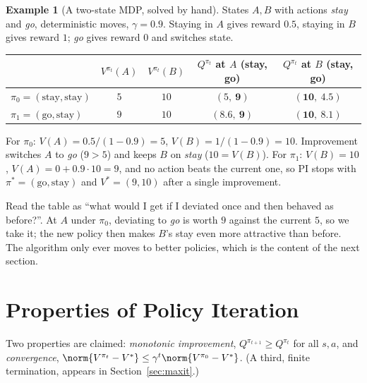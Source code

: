 \documentclass[11pt,a4paper]{article}
\theoremstyle{plain}
\theoremstyle{definition}
\newtheorem{example}[theorem]{Example}
\theoremstyle{remark}
\begin{document}
\begin{example}[A two-state MDP, solved by hand]\label{ex:two}
States $A,B$ with actions \emph{stay} and \emph{go}, deterministic moves, $\gamma=0.9$. Staying in $A$ gives reward $0.5$, staying in $B$ gives reward $1$; \emph{go} gives reward $0$ and switches state.
\begin{center}\small
\begin{tabular}{@{}lcccc@{}}\toprule
 & $V^{\pi_t}(A)$ & $V^{\pi_t}(B)$ & $Q^{\pi_t}$ at $A$ (stay, go) & $Q^{\pi_t}$ at $B$ (stay, go)\\\midrule
$\pi_0=(\text{stay},\text{stay})$ & $5$ & $10$ & $(5,\ \mathbf{9})$ & $(\mathbf{10},\ 4.5)$\\
$\pi_1=(\text{go},\text{stay})$ & $9$ & $10$ & $(8.6,\ \mathbf{9})$ & $(\mathbf{10},\ 8.1)$\\\bottomrule
\end{tabular}
\end{center}
For $\pi_0$: $V(A)=0.5/(1-0.9)=5$, $V(B)=1/(1-0.9)=10$. Improvement switches $A$ to \emph{go} ($9>5$) and keeps $B$ on \emph{stay} ($10=V(B)$). For $\pi_1$: $V(B)=10$, $V(A)=0+0.9\cdot10=9$, and no action beats the current one, so PI stops with $\pi^*=(\text{go},\text{stay})$ and $V^*=(9,10)$ after a single improvement.
\end{example}

\begin{intuition}
Read the table as ``what would I get if I deviated once and then behaved as before?''. At $A$ under $\pi_0$, deviating to \emph{go} is worth $9$ against the current $5$, so we take it; the new policy then makes $B$'s stay even more attractive than before. The algorithm only ever moves to better policies, which is the content of the next section.
\end{intuition}

\section{Properties of Policy Iteration}
Two properties are claimed: \emph{monotonic improvement}, $Q^{\pi_{t+1}}\ge Q^{\pi_t}$ for all $s,a$, and \emph{convergence}, $\norm{V^{\pi_t}-V^*}\le\gamma^t\norm{V^{\pi_0}-V^*}$. (A third, finite termination, appears in Section~\ref{sec:maxit}.)
\end{document}
